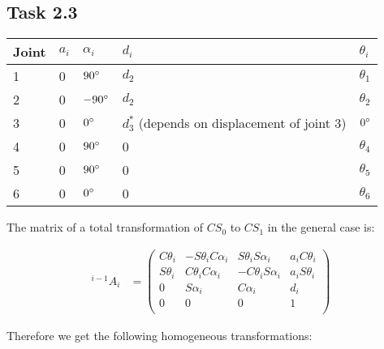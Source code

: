 \subsection*{Task 2.3}

\begin{center}
	\begin{tabular}{ | l | l | l | l | l |}
		\hline
		Joint & $a_{i}$ & $\alpha_{i}$ & $d_i$ & $\theta_i$ \\ \hline
		1 & 0 & $90\degree$ & $d_2$ & $\theta_1$\\ \hline
		2 & 0 & $-90\degree$ & $d_2$ & $\theta_2$\\ \hline
		3 & 0 & $0\degree$ & $d^*_3$ (depends on displacement of joint 3) & $0\degree$\\ \hline
		4 & 0 & $90\degree$ & 0 & $\theta_4$\\ \hline
		5 & 0 & $90\degree$ & 0 & $\theta_5$\\ \hline
		6 & 0 & $0\degree$ & 0 & $\theta_6$\\ \hline
	\end{tabular}
\end{center}

The matrix of a total transformation of $CS_0$ to $CS_1$ in the general case is:

\begin{align*}
^{i-1}A_i &= 
\begin{pmatrix}
C\theta_i & -S\theta_iC\alpha_i & S\theta_iS\alpha_i & a_iC\theta_i \\
S\theta_i & C\theta_iC\alpha_i & -C\theta_iS\alpha_i & a_iS\theta_i \\
0 & S\alpha_i & C\alpha_i & d_i \\
0 & 0 & 0 & 1 \\
\end{pmatrix}
\end{align*}

Therefore we get the following homogeneous transformations: